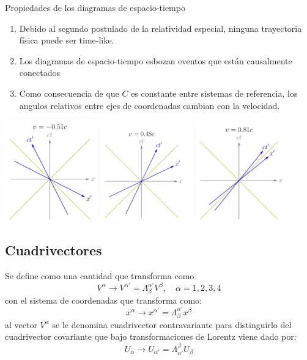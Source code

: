 \documentclass[../main]{subfiles}
\begin{document}
Propiedades de los diagramas de espacio-tiempo 
\begin{enumerate}
    \item Debido al segundo postulado de la relatividad especial, ninguna trayectoria física puede ser time-like.
    \item Los diagramas de espacio-tiempo esbozan eventos que están causalmente conectados
    \item Como consecuencia de que $C$ es constante entre sistemas de referencia, los angulos relativos entre ejes de coordenadas cambian con la velocidad.
\end{enumerate}
\begin{center}
    \includegraphics[width=0.3\textwidth]{img/imgRG2.6.PNG}
    \includegraphics[width=0.3\textwidth]{img/imgRG2.7.PNG}
    \includegraphics[width=0.3\textwidth]{img/imgRG2.8.PNG}    
\end{center}

\subsection{Cuadrivectores}
Se define como una cantidad que transforma como 
\begin{equation}
    V^{\alpha} \rightarrow V^{\alpha'}=\Lambda^{\alpha'}_{\beta} V^{\beta},\quad \alpha=1, 2, 3, 4
\end{equation}
con el sistema de coordenadas que transforma como:
\begin{equation}
    x^{\alpha}\rightarrow x^{\alpha'}=\Lambda^{\alpha'}_{\beta}x^{\beta}
\end{equation}
al vector $V^{\alpha}$ se le denomina cuadrivector contravariante para distinguirlo del cuadrivector covariante que bajo transformaciones de Lorentz viene dado por: 
\begin{equation}
    U_{\alpha} \rightarrow U_{\alpha'}=\Lambda_{\alpha'}^{\beta} U_{\beta}
\end{equation}
\end{document}
